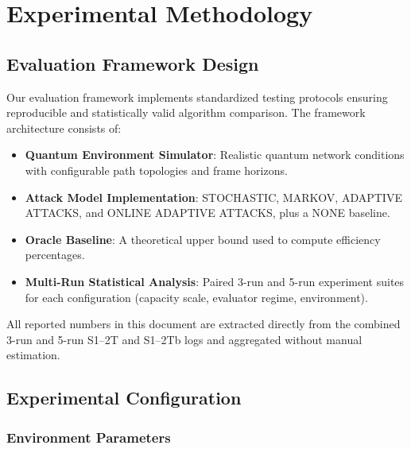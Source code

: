 \documentclass[12pt,a4paper]{article}
\begin{document}
\newpage
\section{Experimental Methodology}

\subsection{Evaluation Framework Design}

Our evaluation framework implements standardized testing protocols ensuring reproducible and statistically valid algorithm comparison. The framework architecture consists of:

\begin{itemize}
\item \textbf{Quantum Environment Simulator}: Realistic quantum network conditions with configurable path topologies and frame horizons.
\item \textbf{Attack Model Implementation}: STOCHASTIC, MARKOV, ADAPTIVE ATTACKS, and ONLINE ADAPTIVE ATTACKS, plus a NONE baseline.
\item \textbf{Oracle Baseline}: A theoretical upper bound used to compute efficiency percentages.
\item \textbf{Multi-Run Statistical Analysis}: Paired 3-run and 5-run experiment suites for each configuration (capacity scale, evaluator regime, environment).
\end{itemize}

All reported numbers in this document are extracted directly from the combined 3-run and 5-run S1–2T and S1–2Tb logs and aggregated without manual estimation.

\subsection{Experimental Configuration}

\subsubsection{Environment Parameters}
\end{document}
